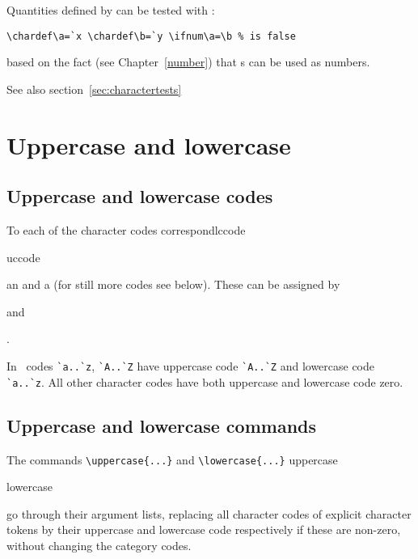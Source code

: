 Quantities defined by  can be tested with
:
\begin{verbatim}
\chardef\a=`x \chardef\b=`y \ifnum\a=\b % is false 
\end{verbatim}
based on the fact (see Chapter~\ref{number}) that
s can be used as numbers.

See also section~\ref{sec:charactertests}


\section{Uppercase and lowercase}

\subsection{Uppercase and lowercase codes}
\label{uc/lc}

To each of the character codes correspond\cstoidx lccode\par\cstoidx uccode\par
an 
and a 
(for still more codes see below).
These can be assigned
by 
\begin{Disp}\end{Disp}
and 
\begin{Disp}.\end{Disp}
In \IniTeX\ codes \verb-`a..`z-, \verb-`A..`Z- have uppercase code
\label{ini:uclc}
\verb-`A..`Z- and lowercase code \verb-`a..`z-.
All other character codes have both uppercase and lowercase
code zero.

\subsection{Uppercase and lowercase commands}
\label{upcase}

The commands \verb-\uppercase{...}- and \verb-\lowercase{...}-
\cstoidx uppercase\par\cstoidx lowercase\par
go through their argument lists, replacing all character 
codes of explicit character tokens
by their uppercase and lowercase code respectively
if these are non-zero,
without changing the category codes. 

